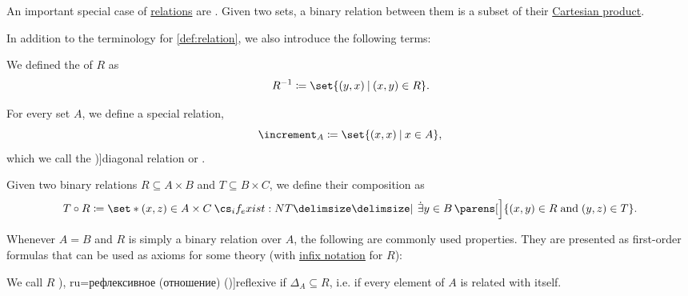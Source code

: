 \begin{definition}\label{def:binary_relation}
  An important special case of \hyperref[def:relation]{relations} are . Given two sets, a binary relation between them is a subset of their \hyperref[def:cartesian_product]{Cartesian product}.

  In addition to the terminology for \cref{def:relation}, we also introduce the following terms:
  \begin{thmenum}[series=def:binary_relation]
     We defined the  of \( R \) as
    \begin{equation*}
      R^{-1} \coloneqq \set{ (y, x) \given (x, y) \in R }.
    \end{equation*}

     For every set \( A \), we define a special relation,
    \begin{equation*}
      \increment_A \coloneqq \set{ (x, x) \given x \in A },
    \end{equation*}
    which we call the \term[ru=диагональное (отношение) (\cite[def. 2.7]{Гуров2013ТеорияРешёток})]{diagonal relation} or .

     Given two binary relations \( R \subseteq A \times B \) and \( T \subseteq B \times C \), we define their composition as
    \begin{equation*}
      T \bincirc R \coloneqq \set*{ (x, z) \in A \times C \given* \qexists {y \in B} \parens[\Big]{ (x, y) \in R \T{and} (y, z) \in T } }.
    \end{equation*}
  \end{thmenum}

  Whenever \( A = B \) and \( R \) is simply a binary relation over \( A \), the following are commonly used properties. They are presented as first-order formulas that can be used as axioms for some theory (with \hyperref[rem:first_order_formula_conventions/infix]{infix notation} for \( R \)):
  \begin{thmenum}[resume=def:binary_relation]
     We call \( R \) \term[bg=рефлексивна (релация) (\cite[369]{ГеновМиховскиМоллов1991Алгебра}), ru=рефлексивное (отношение) (\cite[def. 2.7]{Гуров2013ТеорияРешёток})]{reflexive} if \( \Delta_A \subseteq R \), i.e. if every element of \( A \) is related with itself.


\end{thmenum}
\end{definition}
